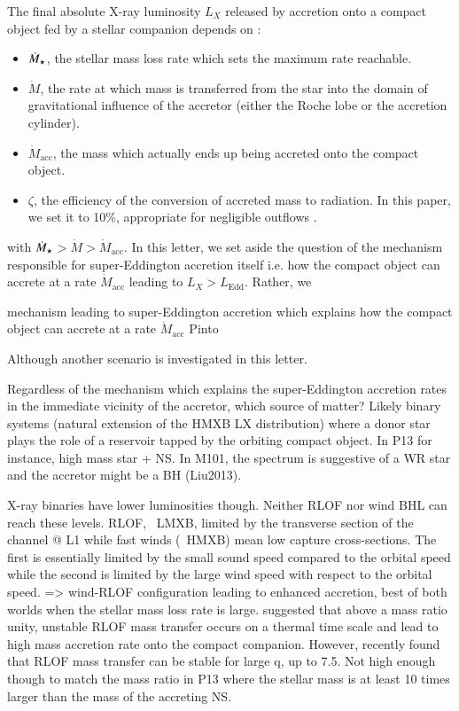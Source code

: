 \documentclass[letter]{aa}
\makeatletter
\newcommand*{\ns}{NS\@\xspace}
\newcommand*{\ie}{i.e.\@\xspace}
\newcommand{\mystar}{{\fontfamily{lmr}\selectfont$\star$}}
\newcommand*{\mdotstar}{$\dot{M}_{\text{\mystar}}$\@\xspace}
\newcommand*{\mdotacc}{$\dot{M}_{\text{acc}}$\@\xspace}
\newcommand*{\ledd}{$L_{\text{Edd}}$\@\xspace}
\makeatother
\begin{document}
The final absolute X-ray luminosity $L_X$ released by accretion onto a compact object fed by a stellar companion depends on :
\begin{itemize}
\item \mdotstar, the stellar mass loss rate which sets the maximum rate reachable.
\item $\dot{M}$, the rate at which mass is transferred from the star into the domain of gravitational influence of the accretor (either the Roche lobe or the accretion cylinder).
\item \mdotacc, the mass which actually ends up being accreted onto the compact object.
\item $\zeta$, the efficiency of the conversion of accreted mass to radiation. In this paper, we set it to 10$\%$, appropriate for negligible outflows \citep{Kaaret2017}.
\end{itemize} 
with \mdotstar$>\dot{M}>$\mdotacc. In this letter, we set aside the question of the mechanism responsible for super-Eddington accretion itself \ie how the compact object can accrete at a rate \mdotacc leading to $L_X>$\ledd. Rather, we  

 mechanism leading to super-Eddington accretion which explains how the compact object can accrete at a rate \mdotacc Pinto

Although another scenario is investigated in this letter.

Regardless of the mechanism which explains the super-Eddington accretion rates in the immediate vicinity of the accretor, which source of matter? Likely binary systems (natural extension of the HMXB LX distribution) where a donor star plays the role of a reservoir tapped by the orbiting compact object. In P13 for instance, high mass star + NS. In M101, the spectrum is suggestive of a WR star and the accretor might be a BH (Liu2013).

X-ray binaries have lower luminosities though. Neither RLOF nor wind BHL can reach these levels. RLOF, ~LMXB, limited by the transverse section of the channel @ L1 while fast winds (~HMXB) mean low capture cross-sections. The first is essentially limited by the small sound speed compared to the orbital speed while the second is limited by the large wind speed with respect to the orbital speed. => wind-RLOF configuration leading to enhanced accretion, best of both worlds when the stellar mass loss rate is large. \cite{King2002} suggested that above a mass ratio unity, unstable RLOF mass transfer occurs on a thermal time scale and lead to high mass accretion rate onto the compact companion. However, \cite{Pavlovskii2017} recently found that RLOF mass transfer can be stable for large q, up to 7.5. Not high enough though to match the mass ratio in P13 where the stellar mass is at least 10 times larger than the mass of the accreting \ns.
\end{document}
